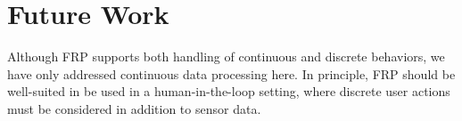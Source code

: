 \section{Future Work}

Although FRP supports both handling of continuous and discrete behaviors, we have only addressed continuous data processing here.
In principle, FRP should be well-suited in be used in a human-in-the-loop setting, where discrete user actions must be considered in addition to sensor data.

